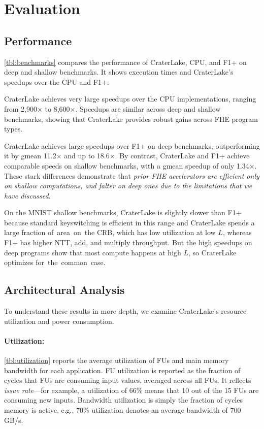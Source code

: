 \section{Evaluation}\label{sec:results}

\subsection{Performance}

\tblBenchmarks

\autoref{tbl:benchmarks} compares the performance of CraterLake, CPU, and F1+
on deep and shallow benchmarks. It shows execution times and CraterLake's
speedups over the CPU and F1+.

CraterLake achieves very large speedups over the CPU implementations, ranging
from 2,900$\times$ to 8,600$\times$. Speedups are similar across deep and
shallow benchmarks, showing that CraterLake provides robust gains across FHE
program types.

CraterLake achieves large speedups over F1+ on deep benchmarks, outperforming
it by gmean 11.2$\times$ and up to 18.6$\times$. By contrast, CraterLake and F1+
achieve comparable speeds on shallow benchmarks, with a gmean speedup of only
1.34$\times$. These stark differences demonstrate that \emph{prior FHE
accelerators are efficient only on shallow computations, and falter on deep
ones due to the limitations that we have discussed}.

On the MNIST shallow benchmarks, CraterLake is slightly slower than F1+ because
standard keyswitching is efficient in this range and CraterLake spends a large
fraction of~area~on~the CRB, which has low utilization at low $L$, whereas F1+
has higher NTT, add, and multiply throughput. But the high speedups on deep
programs show that most compute happens at high $L$, so CraterLake optimizes
for~the~common~case.

\subsection{Architectural Analysis}\label{sec:architecturalAnalysis}

To understand these results in more depth, we examine CraterLake's resource
utilization and power consumption.

\tblUtilization

\paragraph{Utilization:}
\autoref{tbl:utilization} reports the average utilization of FUs and main
memory bandwidth for each application. FU utilization is reported as the
fraction of cycles that FUs are consuming input values, averaged across all
FUs. It reflects \emph{issue rate}---for example, a utilization of 66\% means
that 10 out of the 15 FUs are consuming new inputs. Bandwidth utilization is
simply the fraction of cycles memory is active, e.g., 70\% utilization denotes
an average bandwidth of 700\,GB/s.

